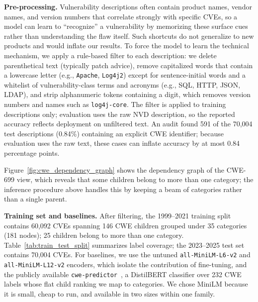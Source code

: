 \documentclass[conference,compsoc]{IEEEtran}
\begin{document}
\textbf{Pre-processing.} Vulnerability descriptions often contain product names, vendor names, and version numbers that correlate strongly with specific CVEs, so a model can learn to ``recognize'' a vulnerability by memorizing these surface cues rather than understanding the flaw itself. Such shortcuts do not generalize to new products and would inflate our results. To force the model to learn the technical mechanism, we apply a rule-based filter to each description: we delete parenthetical text (typically patch advice), remove capitalized words that contain a lowercase letter (e.g., \texttt{Apache}, \texttt{Log4j2}) except for sentence-initial words and a whitelist of vulnerability-class terms and acronyms (e.g., SQL, HTTP, JSON, LDAP), and strip alphanumeric tokens containing a digit, which removes version numbers and names such as \texttt{log4j-core}. The filter is applied to training descriptions only; evaluation uses the raw NVD description, so the reported accuracy reflects deployment on unfiltered text. An audit found 591 of the 70,004 test descriptions (0.84\%) containing an explicit CWE identifier; because evaluation uses the raw text, these cases can inflate accuracy by at most 0.84 percentage points.

Figure~\ref{fig:cwe_dependency_graph} shows the dependency graph of the CWE-699 view, which reveals that some children belong to more than one category; the inference procedure above handles this by keeping a beam of categories rather than a single parent.


\textbf{Training set and baselines.} After filtering, the 1999--2021 training split contains 60,092 CVEs spanning 146 CWE children grouped under 35 categories (181 nodes); 25 children belong to more than one category. Table~\ref{tab:train_test_split} summarizes label coverage; the 2023--2025 test set contains 70,004 CVEs. For baselines, we use the untuned \texttt{all-MiniLM-L6-v2} and \texttt{all-MiniLM-L12-v2} encoders, which isolate the contribution of fine-tuning, and the publicly available \texttt{cwe-predictor}~\cite{mullikencwepredictor}, a DistilBERT classifier over 232 CWE labels whose flat child ranking we map to categories. We chose MiniLM because it is small, cheap to run, and available in two sizes within one family.
\end{document}
